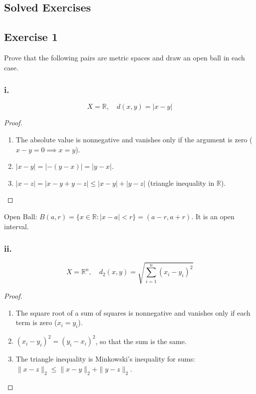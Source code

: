 \documentclass[11pt, a4paper]{article}
\begin{document}
\newpage

\subsection{Solved Exercises}

\subsection*{Exercise 1}

Prove that the following pairs are metric spaces and draw an open ball in each case.

\subsubsection*{i.}
$$ X = \mathbb{R}, \quad d(x, y) = |x - y| $$

\begin{proof}
\begin{enumerate}
    \item The absolute value is nonnegative and vanishes only if the argument is zero
    ($x-y=0 \implies x=y$).
    \item $|x - y| = |-(y - x)| = |y - x|$.
    \item $|x - z| = |x - y + y - z| \le |x - y| + |y - z|$ (triangle inequality in $\mathbb{R}$).
\end{enumerate}
\end{proof}

Open Ball: $B(a, r) = \{ x \in \mathbb{R} : |x - a| < r \} = (a - r, a + r)$. It is an open
interval.

\begin{figure}[H]
\centering
{}
\end{figure}

\subsubsection*{ii.}
$$ X = \mathbb{R}^n, \quad d_2(x, y) = \sqrt{\sum_{i=1}^n (x_i - y_i)^2} $$

\begin{proof}
\begin{enumerate}
    \item The square root of a sum of squares is nonnegative and vanishes only if each term is
    zero ($x_i = y_i$).
    \item $(x_i - y_i)^2 = (y_i - x_i)^2$, so that the sum is the same.
    \item The triangle inequality is Minkowski's inequality for sums:
    $\|x - z\|_2 \le \|x - y\|_2 + \|y - z\|_2$.
\end{enumerate}
\end{proof}
\end{document}
